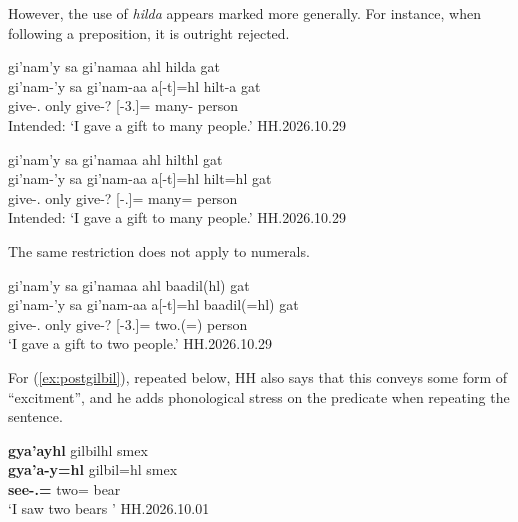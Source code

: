 \documentclass{article}
\begin{document}
However, the use of \textit{hilda} appears marked more generally. For instance, when following a preposition, it is outright rejected.

\begin{exe}
    \ex 
    \begin{xlist}
    \item \glll * gi'nam'y sa gi'namaa ahl hilda gat \\
    {} gi'nam-'y sa gi'nam-aa a[-t]=hl hilt-a gat \\
    {} give-\Fsg{}.\Ii{} only give-\Nmlz{}? \Prep{}[-3.\Ii{}]=\Cn{} many-\Attr{} person \\
    Intended: `I gave a gift to many people.'  \hfill HH.2026.10.29
    \item \glll * gi'nam'y sa gi'namaa ahl hilthl gat \\
    {} gi'nam-'y sa gi'nam-aa a[-t]=hl hilt=hl gat \\
    {} give-\Fsg{}.\Ii{} only give-\Nmlz{}? \Prep{}[-\Ssg{}.\Ii{}]=\Cn{} many=\Cn{} person \\
    Intended: `I gave a gift to many people.'  \hfill HH.2026.10.29
    \end{xlist}
\end{exe}

The same restriction does not apply to numerals. 

\begin{exe}
    \ex \glll gi'nam'y sa gi'namaa ahl baadil(hl) gat \\
    gi'nam-'y sa gi'nam-aa a[-t]=hl baadil(=hl) gat \\
    give-\Fsg{}.\Ii{} only give-\Nmlz{}? \Prep{}[-3.\Ii{}]=\Cn{} two.\Hum{}(=\Cn{}) person \\
    `I gave a gift to two people.' \hfill  HH.2026.10.29
\end{exe}


For (\ref{ex:postgilbil}), repeated below, HH also says that this conveys some form of ``excitment'', and he adds phonological stress on the predicate when repeating the sentence.


\begin{exe}
    \ex \glll \textbf{gya'ayhl} gilbilhl smex \\
   \textbf{ gya'a-y=hl} gilbil=hl smex \\
    \textbf{see-\Fsg{}.\Ii{}=\Cn{}} two=\Cn{} bear \\
    `I saw two bears ' \hfill  HH.2026.10.01\\
\end{exe}
\end{document}
